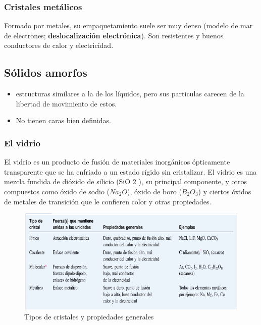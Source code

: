 \documentclass[]{article}
\begin{document}
\subsubsection{Cristales metálicos}
Formado por metales, su empaquetamiento suele ser muy denso (modelo de mar de electrones; \textbf{deslocalización electrónica}). Son resistentes y buenos conductores de calor y electricidad.


\subsection{Sólidos amorfos}

\begin{itemize}
	\item estructuras similares a la de los líquidos, pero sus particulas carecen de la libertad de movimiento de estos.
	\item No tienen caras bien definidas.
\end{itemize}



\subsubsection{El vidrio}
El vidrio es un producto de fusión de materiales inorgánicos ópticamente transparente que se ha enfriado a un estado rígido sin cristalizar.
El vidrio es una mezcla fundida de dióxido de silicio (SiO 2 ), su principal componente, y
otros compuestos como óxido de sodio ($Na_2O$), óxido de boro ($B_2O_3$) y ciertos óxidos de
metales de transición que le confieren color y otras propiedades.

\begin{figure}[H]
\center
\includegraphics[scale=0.53]{foto3.png}
\caption{Tipos de cristales y propiedades generales}
\end{figure}
\end{document}
